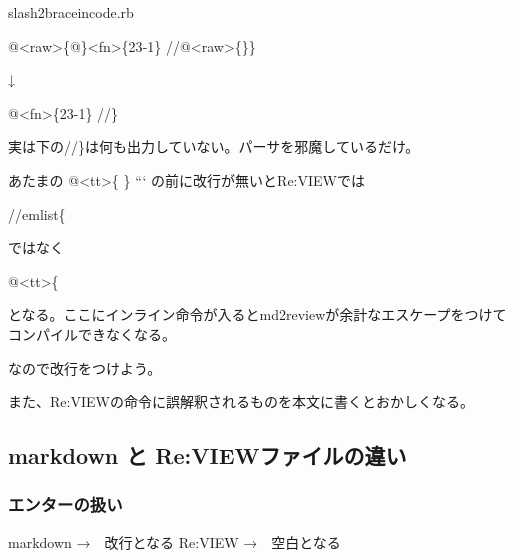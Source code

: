 slash2braceincode.rb

\begin{reviewemlist}
@\textless{}raw\textgreater{}\{@\}\textless{}fn\textgreater{}\{23{-}1\}
//@\textless{}raw\textgreater{}\{\}\}
\end{reviewemlist}

↓

\begin{reviewemlist}
@\textless{}fn\textgreater{}\{23{-}1\}
//\}
\end{reviewemlist}

実は下の//\}は何も出力していない。パーサを邪魔しているだけ。

あたまの
@\textless{}tt\textgreater{}\{
\}
```
の前に改行が無いとRe:VIEWでは

\begin{reviewemlist}
//emlist\{
\end{reviewemlist}

ではなく

\begin{reviewemlist}
@\textless{}tt\textgreater{}\{
\end{reviewemlist}

となる。ここにインライン命令が入るとmd2reviewが余計なエスケープをつけてコンパイルできなくなる。

なので改行をつけよう。

また、Re:VIEWの命令に誤解釈されるものを本文に書くとおかしくなる。

\subsection*{markdown と Re:VIEWファイルの違い}
\label{sec:4-8-3}

\subsubsection*{エンターの扱い}
\label{sec:4-8-3-1}

markdown →　改行となる
Re:VIEW →　空白となる
